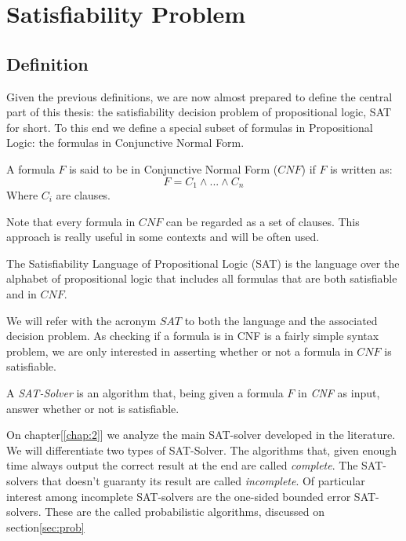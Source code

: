 \section{Satisfiability Problem}
\subsection{Definition}

Given the previous definitions, we are now almost prepared to define the central part of this thesis: the satisfiability decision problem of propositional logic, SAT for short. To this end we define a special subset of formulas in Propositional Logic: the formulas in Conjunctive Normal Form.

\begin{definition}
  A formula $F$ is said to be in Conjunctive Normal Form ($CNF$) if $F$ is written as:
  $$F = C_1\wedge ... \wedge C_n$$
  Where $C_i$  are clauses.
\end{definition}

Note that every formula in $CNF$ can be regarded as a set of clauses. This approach is really useful in some contexts and will be often used.

\begin{definition}
  The Satisfiability Language of Propositional Logic (SAT) is the language over the alphabet of propositional logic that includes all formulas that are both satisfiable and in $CNF$.
\end{definition}

We will refer with the acronym $SAT$ to both the language and the associated decision problem. As checking if a formula is in CNF is a fairly simple syntax problem, we are only interested in asserting whether or not a formula in $CNF$ is satisfiable.

\begin{definition}
  A \emph{SAT-Solver} is an algorithm that, being given a formula $F$ in \emph{CNF} as input, answer whether or not is satisfiable.
\end{definition}

On chapter[\ref{chap:2}] we analyze the main SAT-solver developed in the literature. We will differentiate two types of SAT-Solver. The algorithms that, given enough time always output the correct result at the end are called \emph{complete}. The SAT-solvers that doesn't guaranty its result are called \emph{incomplete}. Of particular interest among incomplete SAT-solvers are the one-sided bounded error SAT-solvers. These are the called probabilistic algorithms, discussed on section\ref{sec:prob}   


